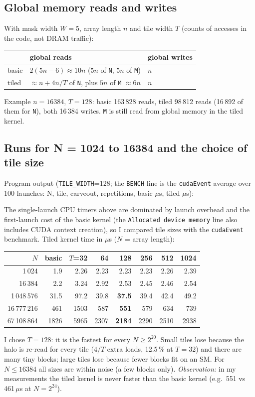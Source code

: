 \documentclass[11pt,a4paper]{article}
\begin{document}
\subsection{Global memory reads and writes}
With mask width $W=5$, array length $n$ and tile width $T$ (counts of accesses in the code, not DRAM traffic):
\begin{center}
\begin{tabular}{lll}
\toprule
 & global reads & global writes \\
\midrule
basic & $2(5n-6)\approx 10n$ ($5n$ of \texttt{N}, $5n$ of \texttt{M}) & $n$ \\
tiled & $\approx n+4n/T$ of \texttt{N}, plus $5n$ of \texttt{M} $\approx 6n$ & $n$ \\
\bottomrule
\end{tabular}
\end{center}
Example $n=16384$, $T=128$: basic 163\,828 reads, tiled 98\,812 reads (16\,892 of them for \texttt{N}), both
16\,384 writes. \texttt{M} is still read from global memory in the tiled kernel.

\subsection{Runs for N = 1024 to 16384 and the choice of tile size}
Program output (\texttt{TILE\_WIDTH}=128; the \texttt{BENCH} line is the \texttt{cudaEvent} average over 100
launches: N, tile, carveout, repetitions, basic $\mu$s, tiled $\mu$s):


The single-launch CPU timers above are dominated by launch overhead and the first-launch cost of the basic kernel
(the \texttt{Allocated device memory} line also includes CUDA context creation), so I compared tile sizes with the
\texttt{cudaEvent} benchmark. Tiled kernel time in $\mu$s ($N$ = array length):
\begin{center}
\small
\begin{tabular}{rrrrrrrr}
\toprule
$N$ & basic & $T$=32 & 64 & 128 & 256 & 512 & 1024 \\
\midrule
1\,024        & 1.9    & 2.26  & 2.23  & 2.23  & 2.23  & 2.26  & 2.39 \\
16\,384       & 2.2    & 3.24  & 2.92  & 2.53  & 2.45  & 2.46  & 2.54 \\
1\,048\,576   & 31.5   & 97.2  & 39.8  & \textbf{37.5} & 39.4 & 42.4 & 49.2 \\
16\,777\,216  & 461    & 1503  & 587   & \textbf{551}  & 579  & 634  & 739 \\
67\,108\,864  & 1826   & 5965  & 2307  & \textbf{2184} & 2290 & 2510 & 2938 \\
\bottomrule
\end{tabular}
\end{center}
I chose $T=128$: it is the fastest for every $N\ge 2^{20}$. Small tiles lose because the halo is re-read for every
tile ($4/T$ extra loads, 12.5\,\% at $T=32$) and there are many tiny blocks; large tiles lose because fewer blocks
fit on an SM. For $N\le 16384$ all sizes are within noise (a few blocks only). \emph{Observation:} in my
measurements the tiled kernel is never faster than the basic kernel (e.g.\ 551 vs 461\,$\mu$s at $N=2^{24}$).
\end{document}
